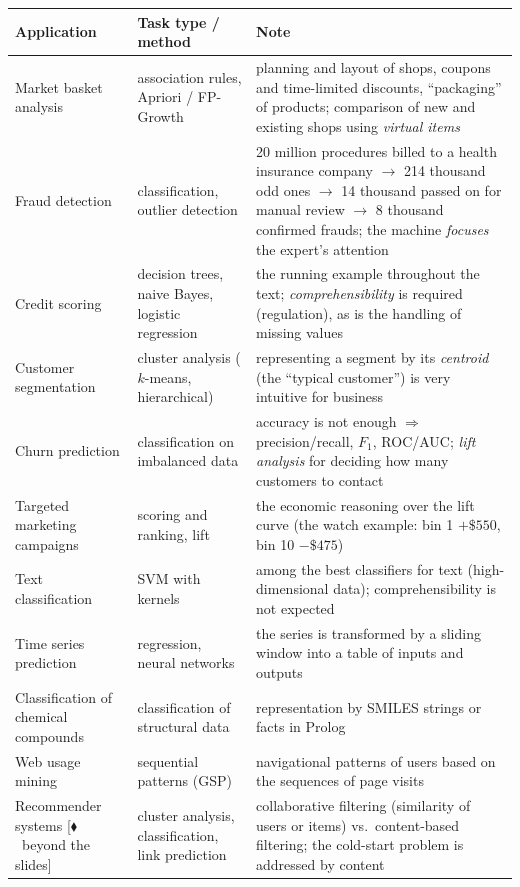\documentclass[11pt,a4paper]{article}
\theoremstyle{definition}
\providecommand{\uv}[1]{``#1''}
\newcommand{\mimo}{\textcolor{markcol}{\textsf{\footnotesize[$\blacklozenge$~beyond the slides]}}}
\begin{document}
\begin{center}
\small
\begin{tabular}{@{}p{3.5cm}p{4.4cm}p{6.9cm}@{}}
\toprule
\textbf{Application} & \textbf{Task type / method} & \textbf{Note} \\
\midrule
Market basket analysis & association rules, Apriori / FP-Growth &
  planning and layout of shops, coupons and time-limited discounts, \uv{packaging} of products;
  comparison of new and existing shops using \emph{virtual items} \\
Fraud detection & classification, outlier detection &
  20 million procedures billed to a health insurance company $\to$ 214 thousand odd ones $\to$ 14
  thousand passed on for manual review $\to$ 8 thousand confirmed frauds; the machine
  \emph{focuses} the expert's attention \\
Credit scoring & decision trees, naive Bayes, logistic regression &
  the running example throughout the text; \emph{comprehensibility} is required (regulation), as is
  the handling of missing values \\
Customer segmentation & cluster analysis ($k$-means, hierarchical) &
  representing a segment by its \emph{centroid} (the \uv{typical customer}) is very intuitive for
  business \\
Churn prediction & classification on imbalanced data &
  accuracy is not enough $\Rightarrow$ precision/recall, $F_1$, ROC/AUC; \emph{lift analysis} for
  deciding how many customers to contact \\
Targeted marketing campaigns & scoring and ranking, lift &
  the economic reasoning over the lift curve (the watch example: bin 1 $+\$550$, bin 10
  $-\$475$) \\
Text classification & SVM with kernels &
  among the best classifiers for text (high-dimensional data); comprehensibility is not expected \\
Time series prediction & regression, neural networks &
  the series is transformed by a sliding window into a table of inputs and outputs \\
Classification of chemical compounds & classification of structural data &
  representation by SMILES strings or facts in Prolog \\
Web usage mining & sequential patterns (GSP) &
  navigational patterns of users based on the sequences of page visits \\
Recommender systems \mimo{} & cluster analysis, classification, link prediction &
  collaborative filtering (similarity of users or items) vs.\ content-based filtering; the cold-start
  problem is addressed by content \\
\bottomrule
\end{tabular}
\end{center}
\end{document}
